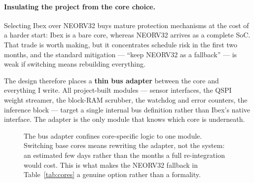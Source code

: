 \documentclass[11pt,a4paper]{article}
\begin{document}
\paragraph{Insulating the project from the core choice.}
Selecting Ibex over NEORV32 buys mature protection mechanisms at the cost of a
harder start: Ibex is a bare core, whereas NEORV32 arrives as a complete SoC.
That trade is worth making, but it concentrates schedule risk in the first two
months, and the standard mitigation --- ``keep NEORV32 as a fallback'' --- is
weak if switching means rebuilding everything.

The design therefore places a \textbf{thin bus adapter} between the core and
everything I write. All project-built modules --- sensor interfaces, the QSPI
weight streamer, the block-RAM scrubber, the watchdog and error counters, the
inference block --- target a single internal bus definition rather than Ibex's
native interface. The adapter is the only module that knows which core is
underneath.

\begin{figure}[htbp]
\centering
{}
\caption{The bus adapter confines core-specific logic to one module. Switching
base cores means rewriting the adapter, not the system: an estimated few days
rather than the months a full re-integration would cost. This is what makes the
NEORV32 fallback in Table~\ref{tab:cores} a genuine option rather than a
formality.}
\label{fig:adapter}
\end{figure}
\end{document}
